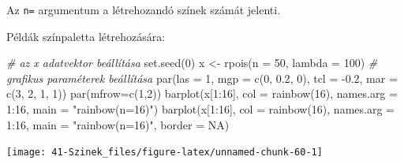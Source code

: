 \documentclass[
]{book}
\newenvironment{Shaded}{\begin{snugshade}}{\end{snugshade}}
\newcommand{\AttributeTok}[1]{\textcolor[rgb]{0.77,0.63,0.00}{#1}}
\newcommand{\CommentTok}[1]{\textcolor[rgb]{0.56,0.35,0.01}{\textit{#1}}}
\newcommand{\ConstantTok}[1]{\textcolor[rgb]{0.00,0.00,0.00}{#1}}
\newcommand{\DecValTok}[1]{\textcolor[rgb]{0.00,0.00,0.81}{#1}}
\newcommand{\FloatTok}[1]{\textcolor[rgb]{0.00,0.00,0.81}{#1}}
\newcommand{\FunctionTok}[1]{\textcolor[rgb]{0.00,0.00,0.00}{#1}}
\newcommand{\NormalTok}[1]{#1}
\newcommand{\OtherTok}[1]{\textcolor[rgb]{0.56,0.35,0.01}{#1}}
\newcommand{\SpecialCharTok}[1]{\textcolor[rgb]{0.00,0.00,0.00}{#1}}
\newcommand{\StringTok}[1]{\textcolor[rgb]{0.31,0.60,0.02}{#1}}
\begin{document}
Az \texttt{n=} argumentum a létrehozandó színek számát jelenti.

Példák színpaletta létrehozására:

\begin{Shaded}
\begin{Highlighting}[]
\CommentTok{\# az x adatvektor beállítása}
\FunctionTok{set.seed}\NormalTok{(}\DecValTok{0}\NormalTok{)}
\NormalTok{x }\OtherTok{\textless{}{-}} \FunctionTok{rpois}\NormalTok{(}\AttributeTok{n =} \DecValTok{50}\NormalTok{, }\AttributeTok{lambda =} \DecValTok{100}\NormalTok{)}
\CommentTok{\# grafikus paraméterek beállítása}
\FunctionTok{par}\NormalTok{(}\AttributeTok{las =} \DecValTok{1}\NormalTok{, }\AttributeTok{mgp =} \FunctionTok{c}\NormalTok{(}\DecValTok{0}\NormalTok{, }\FloatTok{0.2}\NormalTok{, }\DecValTok{0}\NormalTok{), }\AttributeTok{tcl =} \SpecialCharTok{{-}}\FloatTok{0.2}\NormalTok{, }\AttributeTok{mar =} \FunctionTok{c}\NormalTok{(}\DecValTok{3}\NormalTok{, }\DecValTok{2}\NormalTok{, }\DecValTok{1}\NormalTok{, }\DecValTok{1}\NormalTok{))}
\FunctionTok{par}\NormalTok{(}\AttributeTok{mfrow=}\FunctionTok{c}\NormalTok{(}\DecValTok{1}\NormalTok{,}\DecValTok{2}\NormalTok{))}
\FunctionTok{barplot}\NormalTok{(x[}\DecValTok{1}\SpecialCharTok{:}\DecValTok{16}\NormalTok{], }\AttributeTok{col =} \FunctionTok{rainbow}\NormalTok{(}\DecValTok{16}\NormalTok{), }\AttributeTok{names.arg =} \DecValTok{1}\SpecialCharTok{:}\DecValTok{16}\NormalTok{, }\AttributeTok{main =} \StringTok{"rainbow(n=16)"}\NormalTok{)}
\FunctionTok{barplot}\NormalTok{(x[}\DecValTok{1}\SpecialCharTok{:}\DecValTok{16}\NormalTok{], }\AttributeTok{col =} \FunctionTok{rainbow}\NormalTok{(}\DecValTok{16}\NormalTok{), }\AttributeTok{names.arg =} \DecValTok{1}\SpecialCharTok{:}\DecValTok{16}\NormalTok{, }\AttributeTok{main =} \StringTok{"rainbow(n=16)"}\NormalTok{, }\AttributeTok{border =} \ConstantTok{NA}\NormalTok{)}
\end{Highlighting}
\end{Shaded}

\begin{center}\texttt{[image: 41-Szinek\_files/figure-latex/unnamed-chunk-60-1]} \end{center}
\end{document}
